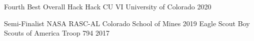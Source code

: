 

\begin{cvhonors}

  \cvhonor
    {Fourth Best Overall Hack}
    {Hack CU VI}
    {University of Colorado}
    {2020}


  \cvhonor
    {Semi-Finalist}
    {NASA RASC-AL}
    {Colorado School of Mines}
    {2019}
  \cvhonor
    {Eagle Scout}
    {Boy Scouts of America}
    {Troop 794}
    {2017}

\end{cvhonors}
